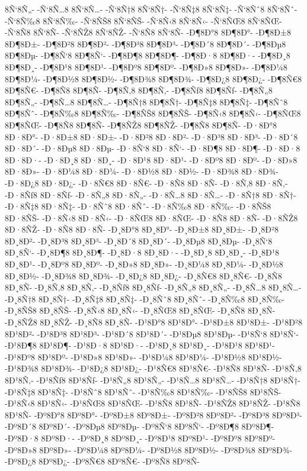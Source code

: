 {8Ñ‘8Ñ„-
-Ñ‘8Ñ…8
8Ñ‘8Ñ…-
-Ñ‘8Ñ†8
8Ñ‘8Ñ†-
-Ñ‘8Ñ‡8
8Ñ‘8Ñ‡-
-Ñ‘8Ñˆ8
8Ñ‘8Ñˆ-
-Ñ‘8Ñ‰8
8Ñ‘8Ñ‰-
-Ñ‘8ÑŠ8
8Ñ‘8ÑŠ-
-Ñ‘8Ñ‹8
8Ñ‘8Ñ‹-
-Ñ‘8ÑŒ8
8Ñ‘8ÑŒ-
-Ñ‘8Ñ8
8Ñ‘8Ñ-
-Ñ‘8ÑŽ8
8Ñ‘8ÑŽ-
-Ñ‘8Ñ8
8Ñ‘8Ñ-
-Ð¶8Ð°8
8Ð¶8Ð°-
-Ð¶8Ð±8
8Ð¶8Ð±-
-Ð¶8Ð²8
8Ð¶8Ð²-
-Ð¶8Ð³8
8Ð¶8Ð³-
-Ð¶8Ð´8
8Ð¶8Ð´-
-Ð¶8Ðµ8
8Ð¶8Ðµ-
-Ð¶8Ñ‘8
8Ð¶8Ñ‘-
-Ð¶8Ð¶8
8Ð¶8Ð¶-
-Ð¶8Ð·8
8Ð¶8Ð·-
-Ð¶8Ð¸8
8Ð¶8Ð¸-
-Ð¶8Ð¹8
8Ð¶8Ð¹-
-Ð¶8Ðº8
8Ð¶8Ðº-
-Ð¶8Ð»8
8Ð¶8Ð»-
-Ð¶8Ð¼8
8Ð¶8Ð¼-
-Ð¶8Ð½8
8Ð¶8Ð½-
-Ð¶8Ð¾8
8Ð¶8Ð¾-
-Ð¶8Ð¿8
8Ð¶8Ð¿-
-Ð¶8Ñ€8
8Ð¶8Ñ€-
-Ð¶8Ñ8
8Ð¶8Ñ-
-Ð¶8Ñ‚8
8Ð¶8Ñ‚-
-Ð¶8Ñƒ8
8Ð¶8Ñƒ-
-Ð¶8Ñ„8
8Ð¶8Ñ„-
-Ð¶8Ñ…8
8Ð¶8Ñ…-
-Ð¶8Ñ†8
8Ð¶8Ñ†-
-Ð¶8Ñ‡8
8Ð¶8Ñ‡-
-Ð¶8Ñˆ8
8Ð¶8Ñˆ-
-Ð¶8Ñ‰8
8Ð¶8Ñ‰-
-Ð¶8ÑŠ8
8Ð¶8ÑŠ-
-Ð¶8Ñ‹8
8Ð¶8Ñ‹-
-Ð¶8ÑŒ8
8Ð¶8ÑŒ-
-Ð¶8Ñ8
8Ð¶8Ñ-
-Ð¶8ÑŽ8
8Ð¶8ÑŽ-
-Ð¶8Ñ8
8Ð¶8Ñ-
-Ð·8Ð°8
8Ð·8Ð°-
-Ð·8Ð±8
8Ð·8Ð±-
-Ð·8Ð²8
8Ð·8Ð²-
-Ð·8Ð³8
8Ð·8Ð³-
-Ð·8Ð´8
8Ð·8Ð´-
-Ð·8Ðµ8
8Ð·8Ðµ-
-Ð·8Ñ‘8
8Ð·8Ñ‘-
-Ð·8Ð¶8
8Ð·8Ð¶-
-Ð·8Ð·8
8Ð·8Ð·-
-Ð·8Ð¸8
8Ð·8Ð¸-
-Ð·8Ð¹8
8Ð·8Ð¹-
-Ð·8Ðº8
8Ð·8Ðº-
-Ð·8Ð»8
8Ð·8Ð»-
-Ð·8Ð¼8
8Ð·8Ð¼-
-Ð·8Ð½8
8Ð·8Ð½-
-Ð·8Ð¾8
8Ð·8Ð¾-
-Ð·8Ð¿8
8Ð·8Ð¿-
-Ð·8Ñ€8
8Ð·8Ñ€-
-Ð·8Ñ8
8Ð·8Ñ-
-Ð·8Ñ‚8
8Ð·8Ñ‚-
-Ð·8Ñƒ8
8Ð·8Ñƒ-
-Ð·8Ñ„8
8Ð·8Ñ„-
-Ð·8Ñ…8
8Ð·8Ñ…-
-Ð·8Ñ†8
8Ð·8Ñ†-
-Ð·8Ñ‡8
8Ð·8Ñ‡-
-Ð·8Ñˆ8
8Ð·8Ñˆ-
-Ð·8Ñ‰8
8Ð·8Ñ‰-
-Ð·8ÑŠ8
8Ð·8ÑŠ-
-Ð·8Ñ‹8
8Ð·8Ñ‹-
-Ð·8ÑŒ8
8Ð·8ÑŒ-
-Ð·8Ñ8
8Ð·8Ñ-
-Ð·8ÑŽ8
8Ð·8ÑŽ-
-Ð·8Ñ8
8Ð·8Ñ-
-Ð¸8Ð°8
8Ð¸8Ð°-
-Ð¸8Ð±8
8Ð¸8Ð±-
-Ð¸8Ð²8
8Ð¸8Ð²-
-Ð¸8Ð³8
8Ð¸8Ð³-
-Ð¸8Ð´8
8Ð¸8Ð´-
-Ð¸8Ðµ8
8Ð¸8Ðµ-
-Ð¸8Ñ‘8
8Ð¸8Ñ‘-
-Ð¸8Ð¶8
8Ð¸8Ð¶-
-Ð¸8Ð·8
8Ð¸8Ð·-
-Ð¸8Ð¸8
8Ð¸8Ð¸-
-Ð¸8Ð¹8
8Ð¸8Ð¹-
-Ð¸8Ðº8
8Ð¸8Ðº-
-Ð¸8Ð»8
8Ð¸8Ð»-
-Ð¸8Ð¼8
8Ð¸8Ð¼-
-Ð¸8Ð½8
8Ð¸8Ð½-
-Ð¸8Ð¾8
8Ð¸8Ð¾-
-Ð¸8Ð¿8
8Ð¸8Ð¿-
-Ð¸8Ñ€8
8Ð¸8Ñ€-
-Ð¸8Ñ8
8Ð¸8Ñ-
-Ð¸8Ñ‚8
8Ð¸8Ñ‚-
-Ð¸8Ñƒ8
8Ð¸8Ñƒ-
-Ð¸8Ñ„8
8Ð¸8Ñ„-
-Ð¸8Ñ…8
8Ð¸8Ñ…-
-Ð¸8Ñ†8
8Ð¸8Ñ†-
-Ð¸8Ñ‡8
8Ð¸8Ñ‡-
-Ð¸8Ñˆ8
8Ð¸8Ñˆ-
-Ð¸8Ñ‰8
8Ð¸8Ñ‰-
-Ð¸8ÑŠ8
8Ð¸8ÑŠ-
-Ð¸8Ñ‹8
8Ð¸8Ñ‹-
-Ð¸8ÑŒ8
8Ð¸8ÑŒ-
-Ð¸8Ñ8
8Ð¸8Ñ-
-Ð¸8ÑŽ8
8Ð¸8ÑŽ-
-Ð¸8Ñ8
8Ð¸8Ñ-
-Ð¹8Ð°8
8Ð¹8Ð°-
-Ð¹8Ð±8
8Ð¹8Ð±-
-Ð¹8Ð²8
8Ð¹8Ð²-
-Ð¹8Ð³8
8Ð¹8Ð³-
-Ð¹8Ð´8
8Ð¹8Ð´-
-Ð¹8Ðµ8
8Ð¹8Ðµ-
-Ð¹8Ñ‘8
8Ð¹8Ñ‘-
-Ð¹8Ð¶8
8Ð¹8Ð¶-
-Ð¹8Ð·8
8Ð¹8Ð·-
-Ð¹8Ð¸8
8Ð¹8Ð¸-
-Ð¹8Ð¹8
8Ð¹8Ð¹-
-Ð¹8Ðº8
8Ð¹8Ðº-
-Ð¹8Ð»8
8Ð¹8Ð»-
-Ð¹8Ð¼8
8Ð¹8Ð¼-
-Ð¹8Ð½8
8Ð¹8Ð½-
-Ð¹8Ð¾8
8Ð¹8Ð¾-
-Ð¹8Ð¿8
8Ð¹8Ð¿-
-Ð¹8Ñ€8
8Ð¹8Ñ€-
-Ð¹8Ñ8
8Ð¹8Ñ-
-Ð¹8Ñ‚8
8Ð¹8Ñ‚-
-Ð¹8Ñƒ8
8Ð¹8Ñƒ-
-Ð¹8Ñ„8
8Ð¹8Ñ„-
-Ð¹8Ñ…8
8Ð¹8Ñ…-
-Ð¹8Ñ†8
8Ð¹8Ñ†-
-Ð¹8Ñ‡8
8Ð¹8Ñ‡-
-Ð¹8Ñˆ8
8Ð¹8Ñˆ-
-Ð¹8Ñ‰8
8Ð¹8Ñ‰-
-Ð¹8ÑŠ8
8Ð¹8ÑŠ-
-Ð¹8Ñ‹8
8Ð¹8Ñ‹-
-Ð¹8ÑŒ8
8Ð¹8ÑŒ-
-Ð¹8Ñ8
8Ð¹8Ñ-
-Ð¹8ÑŽ8
8Ð¹8ÑŽ-
-Ð¹8Ñ8
8Ð¹8Ñ-
-Ðº8Ð°8
8Ðº8Ð°-
-Ðº8Ð±8
8Ðº8Ð±-
-Ðº8Ð²8
8Ðº8Ð²-
-Ðº8Ð³8
8Ðº8Ð³-
-Ðº8Ð´8
8Ðº8Ð´-
-Ðº8Ðµ8
8Ðº8Ðµ-
-Ðº8Ñ‘8
8Ðº8Ñ‘-
-Ðº8Ð¶8
8Ðº8Ð¶-
-Ðº8Ð·8
8Ðº8Ð·-
-Ðº8Ð¸8
8Ðº8Ð¸-
-Ðº8Ð¹8
8Ðº8Ð¹-
-Ðº8Ðº8
8Ðº8Ðº-
-Ðº8Ð»8
8Ðº8Ð»-
-Ðº8Ð¼8
8Ðº8Ð¼-
-Ðº8Ð½8
8Ðº8Ð½-
-Ðº8Ð¾8
8Ðº8Ð¾-
-Ðº8Ð¿8
8Ðº8Ð¿-
-Ðº8Ñ€8
8Ðº8Ñ€-
-Ðº8Ñ8
8Ðº8Ñ-
}
